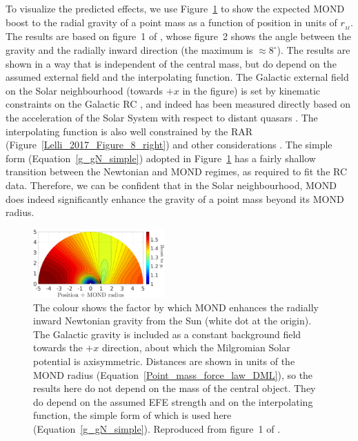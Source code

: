 \documentclass[fleqn,usenatbib,useAMS,onecolumn]{mnras} %
\begin{document}
To visualize the predicted effects, we use Figure~\ref{Banik_2019_spacecraft_force_ratio} to show the expected MOND boost to the radial gravity of a point mass as a function of position in units of $r_{_M}$. The results are based on figure~1 of \citet{Banik_2019_spacecraft}, whose figure~2 shows the angle between the gravity and the radially inward direction (the maximum is $\approx 8^\circ$). The results are shown in a way that is independent of the central mass, but do depend on the assumed external field and the interpolating function. The Galactic external field on the Solar neighbourhood (towards $+x$ in the figure) is set by kinematic constraints on the Galactic RC \citep{McMillan_2017}, and indeed has been measured directly based on the acceleration of the Solar System with respect to distant quasars \citep{Klioner_2021}. The interpolating function is also well constrained by the RAR (Figure~\ref{Lelli_2017_Figure_8_right}) and other considerations \citep[see section~7.1 of][]{Banik_2018_Centauri}. The simple form (Equation~\ref{g_gN_simple}) adopted in Figure~\ref{Banik_2019_spacecraft_force_ratio} has a fairly shallow transition between the Newtonian and MOND regimes, as required to fit the RC data. Therefore, we can be confident that in the Solar neighbourhood, MOND does indeed significantly enhance the gravity of a point mass beyond its MOND radius.

\begin{figure}
	\centering
	\includegraphics[width=0.45\textwidth]{Banik_2019_spacecraft_Figure_1}
	\caption{The colour shows the factor by which MOND enhances the radially inward Newtonian gravity from the Sun (white dot at the origin). The Galactic gravity is included as a constant background field towards the $+x$ direction, about which the Milgromian Solar potential is axisymmetric. Distances are shown in units of the MOND radius (Equation~\ref{Point_mass_force_law_DML}), so the results here do not depend on the mass of the central object. They do depend on the assumed EFE strength and on the interpolating function, the simple form of which is used here (Equation~\ref{g_gN_simple}). Reproduced from figure~1 of \citet{Banik_2019_spacecraft}.}
	\label{Banik_2019_spacecraft_force_ratio}
\end{figure}
\end{document}

